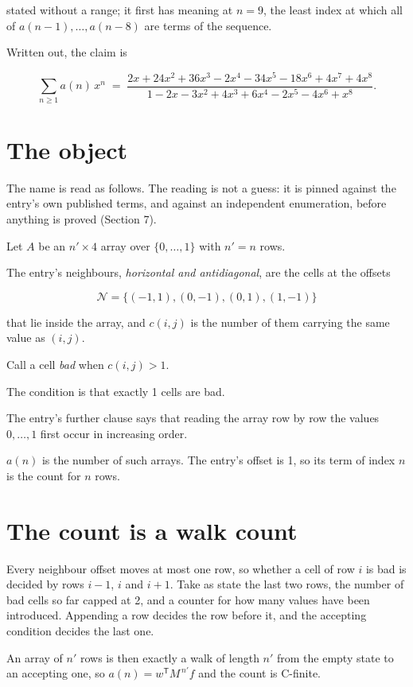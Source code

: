 \documentclass[11pt]{article}
\theoremstyle{definition}
\begin{document}
stated without a range; it first has meaning at $n = 9$, the least index at which all of $a(n-1),\dots,a(n-8)$ are terms of the sequence.

Written out, the claim is

\[\sum_{n \ge 1} a(n)\,x^n \;=\; \frac{2x + 24x^{2} + 36x^{3} - 2x^{4} - 34x^{5} - 18x^{6} + 4x^{7} + 4x^{8}}{1 - 2x - 3x^{2} + 4x^{3} + 6x^{4} - 2x^{5} - 4x^{6} + x^{8}}.\]

\section{The object}

The name is read as follows. The reading is not a guess: it is pinned against the entry's own published terms, and against an independent enumeration, before anything is proved (Section 7).

Let $A$ be an $n' \times 4$ array over $\{0,\dots,1\}$ with $n' = n$ rows.

The entry's neighbours, {\itshape horizontal and antidiagonal}, are the cells at the offsets

\[\mathcal{N} = \{(-1,1), (0,-1), (0,1), (1,-1)\}\]

that lie inside the array, and $c(i,j)$ is the number of them carrying the same value as $(i,j)$.

Call a cell {\itshape bad} when $c(i,j) > 1$.

The condition is that exactly 1 cells are bad.

The entry's further clause says that reading the array row by row the values $0,\dots,1$ first occur in increasing order.

$a(n)$ is the number of such arrays. The entry's offset is 1, so its term of index $n$ is the count for $n$ rows.

\section{The count is a walk count}

Every neighbour offset moves at most one row, so whether a cell of row $i$ is bad is decided by rows $i-1$, $i$ and $i+1$. Take as state the last two rows, the number of bad cells so far capped at 2, and a counter for how many values have been introduced. Appending a row decides the row before it, and the accepting condition decides the last one.

An array of $n'$ rows is then exactly a walk of length $n'$ from the empty state to an accepting one, so $a(n) = w^{\mathsf T}M^{\,n'}f$ and the count is C-finite.
\end{document}
